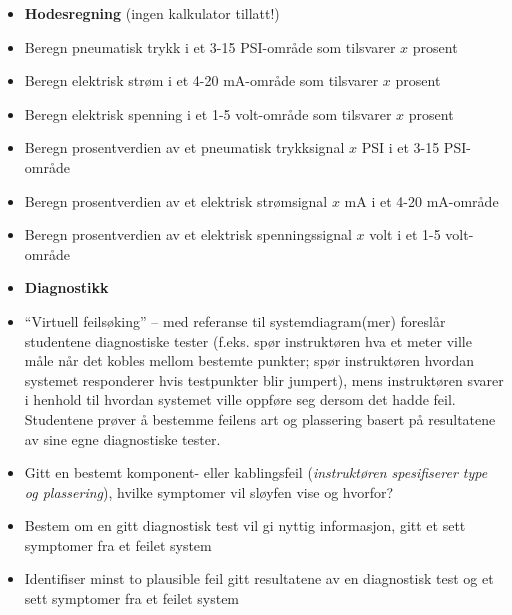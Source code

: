 \begin{itemize}
\item{} {\bf Hodesregning} (ingen kalkulator tillatt!)
\item{} Beregn pneumatisk trykk i et 3-15 PSI-område som tilsvarer $x$ prosent
\item{} Beregn elektrisk strøm i et 4-20 mA-område som tilsvarer $x$ prosent
\item{} Beregn elektrisk spenning i et 1-5 volt-område som tilsvarer $x$ prosent
\item{} Beregn prosentverdien av et pneumatisk trykksignal $x$ PSI i et 3-15 PSI-område
\item{} Beregn prosentverdien av et elektrisk strømsignal $x$ mA i et 4-20 mA-område
\item{} Beregn prosentverdien av et elektrisk spenningssignal $x$ volt i et 1-5 volt-område
\end{itemize}

\filbreak


\begin{itemize}
\item{} {\bf Diagnostikk}
\item{} ``Virtuell feilsøking'' -- med referanse til systemdiagram(mer) foreslår studentene diagnostiske tester (f.eks. spør instruktøren hva et meter ville måle når det kobles mellom bestemte punkter; spør instruktøren hvordan systemet responderer hvis testpunkter blir jumpert), mens instruktøren svarer i henhold til hvordan systemet ville oppføre seg dersom det hadde feil.  Studentene prøver å bestemme feilens art og plassering basert på resultatene av sine egne diagnostiske tester.
\item{} Gitt en bestemt komponent- eller kablingsfeil ({\it instruktøren spesifiserer type og plassering}), hvilke symptomer vil sløyfen vise og hvorfor?
\item{} Bestem om en gitt diagnostisk test vil gi nyttig informasjon, gitt et sett symptomer fra et feilet system
\item{} Identifiser minst to plausible feil gitt resultatene av en diagnostisk test og et sett symptomer fra et feilet system
\end{itemize}









\vfil \eject

